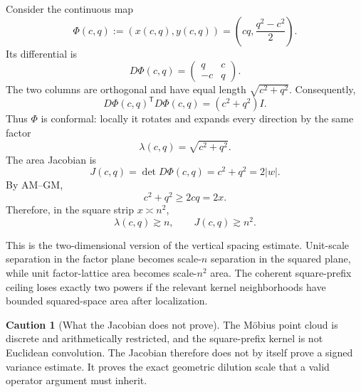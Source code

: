 \documentclass[11pt]{article}
\theoremstyle{definition}
\newtheorem{caution}[theorem]{Caution}
\newcommand{\1}{\mathbf{1}}
\begin{document}
Consider the continuous map
\begin{equation}
 \Phi(c,q)
 :=
 \left(
 x(c,q),y(c,q)
 \right)
 =
 \left(
 cq,\frac{q^2-c^2}{2}
 \right).
 \label{eq:Phi}
\end{equation}
Its differential is
\begin{equation}
 D\Phi(c,q)
 =
 \begin{pmatrix}
 q & c\\
 -c & q
 \end{pmatrix}.
 \label{eq:D-Phi}
\end{equation}
The two columns are orthogonal and have equal length $\sqrt{c^2+q^2}$.  Consequently,
\begin{equation}
 D\Phi(c,q)^{\mathsf T}D\Phi(c,q)
 =(c^2+q^2)I.
 \label{eq:conformal-metric}
\end{equation}
Thus $\Phi$ is conformal: locally it rotates and expands every direction by the same factor
\begin{equation}
 \lambda(c,q)=\sqrt{c^2+q^2}.
 \label{eq:length-scale}
\end{equation}
The area Jacobian is
\begin{equation}
 \boxed{
 J(c,q)=\det D\Phi(c,q)=c^2+q^2=2|w|.
 }
 \label{eq:Jacobian}
\end{equation}
By AM--GM,
\begin{equation}
 c^2+q^2\ge2cq=2x.
 \label{eq:Jacobian-lower}
\end{equation}
Therefore, in the square strip $x\asymp n^2$,
\begin{equation}
 \lambda(c,q)\gtrsim n,
 \qquad
 J(c,q)\gtrsim n^2.
 \label{eq:square-scale-expansion}
\end{equation}

This is the two-dimensional version of the vertical spacing estimate.  Unit-scale separation in the factor plane becomes scale-$n$ separation in the squared plane, while unit factor-lattice area becomes scale-$n^2$ area.  The coherent square-prefix ceiling loses exactly two powers if the relevant kernel neighborhoods have bounded squared-space area after localization.

\begin{caution}[What the Jacobian does not prove]
The M\"obius point cloud is discrete and arithmetically restricted, and the square-prefix kernel is not Euclidean convolution.  The Jacobian therefore does not by itself prove a signed variance estimate.  It proves the exact geometric dilution scale that a valid operator argument must inherit.
\end{caution}
\end{document}
